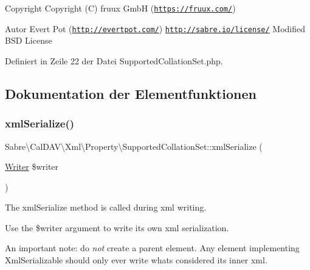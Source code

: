 \begin{DoxyCopyright}{Copyright}
Copyright (C) fruux GmbH (\href{https://fruux.com/}{\tt https\+://fruux.\+com/}) 
\end{DoxyCopyright}
\begin{DoxyAuthor}{Autor}
Evert Pot (\href{http://evertpot.com/}{\tt http\+://evertpot.\+com/})  \href{http://sabre.io/license/}{\tt http\+://sabre.\+io/license/} Modified B\+SD License 
\end{DoxyAuthor}


Definiert in Zeile 22 der Datei Supported\+Collation\+Set.\+php.



\subsection{Dokumentation der Elementfunktionen}
\mbox{\label{class_sabre_1_1_cal_d_a_v_1_1_xml_1_1_property_1_1_supported_collation_set_ab5e9f7048ec0723afe382543bdd9282e}} 
\subsubsection{\texorpdfstring{xml\+Serialize()}{xmlSerialize()}}
{\footnotesize\ttfamily Sabre\textbackslash{}\+Cal\+D\+A\+V\textbackslash{}\+Xml\textbackslash{}\+Property\textbackslash{}\+Supported\+Collation\+Set\+::xml\+Serialize (\begin{DoxyParamCaption}\item[{\mbox{\hyperlink{class_sabre_1_1_xml_1_1_writer}{Writer}}}]{\$writer }\end{DoxyParamCaption})}

The xml\+Serialize method is called during xml writing.

Use the \$writer argument to write its own xml serialization.

An important note\+: do {\itshape not} create a parent element. Any element implementing Xml\+Serializable should only ever write what\textquotesingle{}s considered its \textquotesingle{}inner xml\textquotesingle{}.

